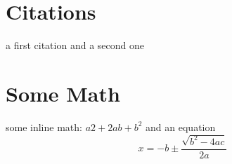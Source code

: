 \documentclass{article}
\begin{document}
\section{Citations}
a first citation \cite{aaa} and a second one \cite{bbb}

\section{Some Math}
some inline math: $a2+2ab+b^2$ and an equation 
\begin{equation}
  x = -b\pm \frac{\sqrt{b^2-4ac}}{2a}
\end{equation}


\end{document}

